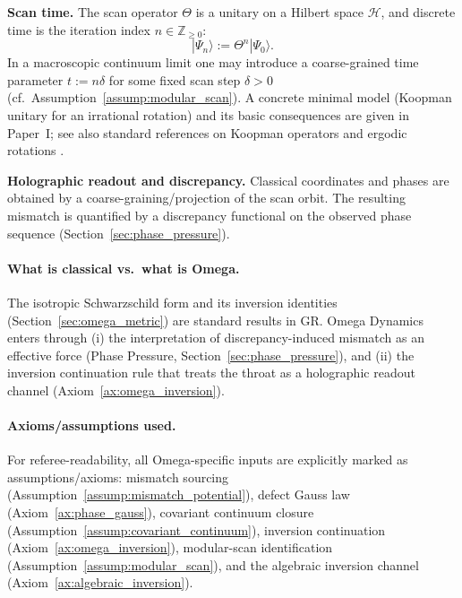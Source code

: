 \textbf{Scan time.} The scan operator $\Theta$ is a unitary on a Hilbert space $\mathcal{H}$, and discrete time is the iteration index $n\in\mathbb{Z}_{\ge 0}$:
\begin{equation}
  |\Psi_n\rangle := \Theta^n |\Psi_0\rangle .
\end{equation}
In a macroscopic continuum limit one may introduce a coarse-grained time parameter $t:=n\delta$ for some fixed scan step $\delta>0$ (cf.\ Assumption~\ref{assump:modular_scan}).
A concrete minimal model (Koopman unitary for an irrational rotation) and its basic consequences are given in Paper~I; see also standard references on Koopman operators and ergodic rotations \cite{Koopman1931, KuipersNiederreiter1974, Ma2025HPA}.

\textbf{Holographic readout and discrepancy.} Classical coordinates and phases are obtained by a coarse-graining/projection of the scan orbit. The resulting mismatch is quantified by a discrepancy functional on the observed phase sequence (Section~\ref{sec:phase_pressure}).

\paragraph{What is classical vs.\ what is Omega.}
The isotropic Schwarzschild form and its inversion identities (Section~\ref{sec:omega_metric}) are standard results in GR. Omega Dynamics enters through (i) the interpretation of discrepancy-induced mismatch as an effective force (Phase Pressure, Section~\ref{sec:phase_pressure}), and (ii) the inversion continuation rule that treats the throat as a holographic readout channel (Axiom~\ref{ax:omega_inversion}).

\paragraph{Axioms/assumptions used.}
For referee-readability, all Omega-specific inputs are explicitly marked as assumptions/axioms: mismatch sourcing (Assumption~\ref{assump:mismatch_potential}), defect Gauss law (Axiom~\ref{ax:phase_gauss}), covariant continuum closure (Assumption~\ref{assump:covariant_continuum}), inversion continuation (Axiom~\ref{ax:omega_inversion}), modular-scan identification (Assumption~\ref{assump:modular_scan}), and the algebraic inversion channel (Axiom~\ref{ax:algebraic_inversion}).

